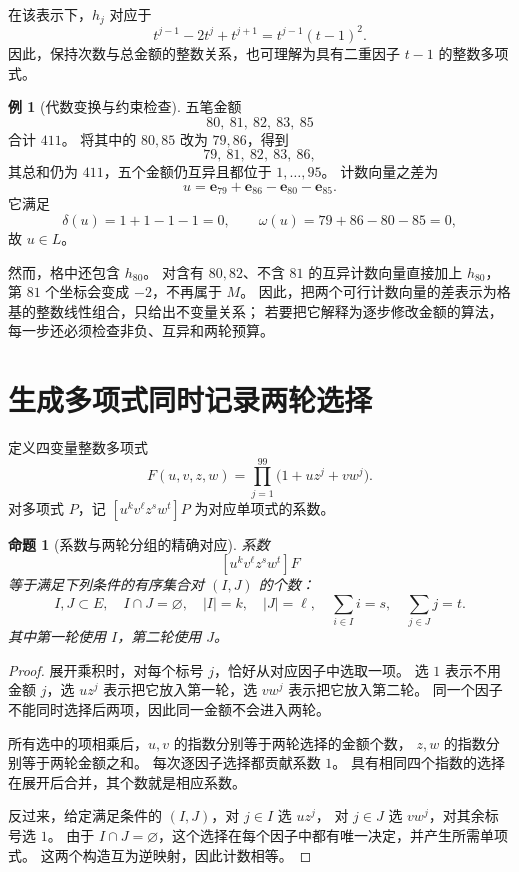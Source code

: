 \documentclass[UTF8,a4paper]{ctexbook}
\newtheorem{proposition}[theorem]{命题}
\theoremstyle{definition}
\newtheorem{example}[theorem]{例}
\numberwithin{equation}{chapter}
\newcommand{\1}{\mathbf{1}}
\begin{document}
在该表示下，\(h_j\) 对应于
\[
t^{j-1}-2t^j+t^{j+1}=t^{j-1}(t-1)^2.
\]
因此，保持次数与总金额的整数关系，也可理解为具有二重因子 \(t-1\) 的整数多项式。

\begin{example}[代数变换与约束检查]\label{aa:local-move}
五笔金额
\[
80,\ 81,\ 82,\ 83,\ 85
\]
合计 \(411\)。
将其中的 \(80,85\) 改为 \(79,86\)，得到
\[
79,\ 81,\ 82,\ 83,\ 86,
\]
其总和仍为 \(411\)，五个金额仍互异且都位于 \(1,\ldots,95\)。
计数向量之差为
\[
u=\mathbf e_{79}+\mathbf e_{86}-\mathbf e_{80}-\mathbf e_{85}.
\]
它满足
\[
\delta(u)=1+1-1-1=0,\qquad
\omega(u)=79+86-80-85=0,
\]
故 \(u\in L\)。

然而，格中还包含 \(h_{80}\)。
对含有 \(80,82\)、不含 \(81\) 的互异计数向量直接加上 \(h_{80}\)，
第 \(81\) 个坐标会变成 \(-2\)，不再属于 \(M\)。
因此，把两个可行计数向量的差表示为格基的整数线性组合，只给出不变量关系；
若要把它解释为逐步修改金额的算法，每一步还必须检查非负、互异和两轮预算。
\end{example}

\section{生成多项式同时记录两轮选择}

定义四变量整数多项式
\begin{equation}\label{aa:colored-generator}
F(u,v,z,w)=\prod_{j=1}^{99}\bigl(1+u z^j+v w^j\bigr).
\end{equation}
对多项式 \(P\)，记
\([u^kv^\ell z^s w^t]P\) 为对应单项式的系数。

\begin{proposition}[系数与两轮分组的精确对应]\label{aa:coefficient}
系数
\[
[u^kv^\ell z^s w^t]F
\]
等于满足下列条件的有序集合对 \((I,J)\) 的个数：
\[
I,J\subset E,\quad I\cap J=\varnothing,\quad
|I|=k,\quad|J|=\ell,\quad
\sum_{i\in I}i=s,\quad\sum_{j\in J}j=t.
\]
其中第一轮使用 \(I\)，第二轮使用 \(J\)。
\end{proposition}

\begin{proof}
展开乘积时，对每个标号 \(j\)，恰好从对应因子中选取一项。
选 \(1\) 表示不用金额 \(j\)，选 \(uz^j\) 表示把它放入第一轮，选 \(vw^j\) 表示把它放入第二轮。
同一个因子不能同时选择后两项，因此同一金额不会进入两轮。

所有选中的项相乘后，\(u,v\) 的指数分别等于两轮选择的金额个数，
\(z,w\) 的指数分别等于两轮金额之和。
每次逐因子选择都贡献系数 \(1\)。
具有相同四个指数的选择在展开后合并，其个数就是相应系数。

反过来，给定满足条件的 \((I,J)\)，对 \(j\in I\) 选 \(uz^j\)，
对 \(j\in J\) 选 \(vw^j\)，对其余标号选 \(1\)。
由于 \(I\cap J=\varnothing\)，这个选择在每个因子中都有唯一决定，并产生所需单项式。
这两个构造互为逆映射，因此计数相等。
\end{proof}
\end{document}
